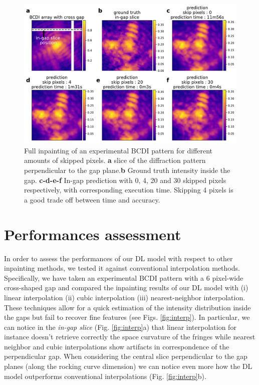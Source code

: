 \begin{figure}[h]
    \centering
    \includegraphics[width=\textwidth]{figures/Inpainting/Skip_pixels_ingap_slice.pdf}
    \caption{Full inpainting of an experimental BCDI pattern for different amounts of skipped pixels. \textbf{a}
    slice of the diffraction pattern perpendicular to the gap plane.\textbf{b} Ground truth intensity inside the gap.
    \textbf{c-d-e-f} In-gap prediction with 0, 4, 20 and 30 skipped pixels respectively, with corresponding 
    execution time. Skipping 4 pixels is a good trade off between time and accuracy.}
    \label{fig:skip_figure}
\end{figure}

\section{Performances assessment}\label{sec:performances}

In order to assess the performances of our DL model with respect to other inpainting methods, we tested it against 
conventional interpolation methods. Specifically, we have taken an experimental BCDI pattern with a 6 pixel-wide 
cross-shaped gap and compared the inpainting results of our DL model with (i) linear interpolation (ii) cubic interpolation 
(iii) nearest-neighbor interpolation. These techniques allow for a quick estimation of the intensity distribution 
inside the gaps but fail to recover fine features (see Figs. \ref{fig:interp}). In particular, we can notice 
in the \textit{in-gap slice} (Fig. \ref{fig:interp}a) that linear interpolation for instance doesn't retrieve correctly 
the space curvature of the fringes while nearest neighbor and cubic interpolations show artifacts in correspondence 
of the perpendicular gap. When considering the central slice perpendicular to the gap planes (along the rocking curve
dimension) we can notice even more how the DL model outperforms conventional interpolations (Fig. \ref{fig:interp}b).
 

